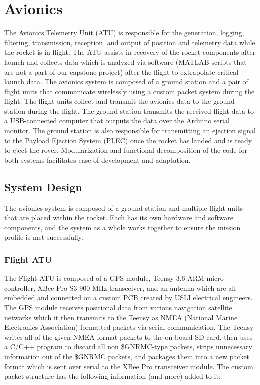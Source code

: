 \documentclass[journal,10pt,draftclsnofoot,onecolumn,compsoc]{IEEEtran} \usepackage[margin=0.75in]{geometry}
\begin{document}
\newpage

\section{Avionics}
The Avionics Telemetry Unit (ATU) is responsible for the generation, logging, filtering, transmission, reception, and output of position and telemetry data while the rocket is in flight. The ATU assists in recovery of the rocket components after launch and collects data which is analyzed via software (MATLAB scripts that are not a part of our capstone project) after the flight to extrapolate critical launch data. The avionics system is composed of a ground station and a pair of flight units that communicate wirelessly using a custom packet system during the flight. The flight units collect and transmit the avionics data to the ground station during the flight. The ground station transmits the received flight data to a USB-connected computer that outputs the data over the Arduino serial monitor. The ground station is also responsible for transmitting an ejection signal to the Payload Ejection System (PLEC) once the rocket has landed and is ready to eject the rover. Modularization and functional decomposition of the code for both systems facilitates ease of development and adaptation.

\subsection{System Design}
The avionics system is composed of a ground station and multiple flight units that are placed within the rocket. Each has its own hardware and software components, and the system as a whole works together to ensure the mission profile is met successfully.

\subsubsection{Flight ATU}
The Flight ATU is composed of a GPS module, Teensy 3.6 ARM micro-controller, XBee Pro S3 900 MHz transceiver, and an antenna which are all embedded and connected on a custom PCB created by USLI electrical engineers. The GPS module receives positional data from various navigation satellite networks which it then transmits to the Teensy as NMEA (National Marine Electronics Association) formatted packets via serial communication. The Teensy writes all of the given NMEA-format packets to the on-board SD card, then uses a C/C++ program to discard all non \$GNRMC-type packets, strips unnecessary information out of the \$GNRMC packets, and packages them into a new packet format which is sent over serial to the XBee Pro transceiver module. The custom packet structure has the following information (and more) added to it:
\end{document}
